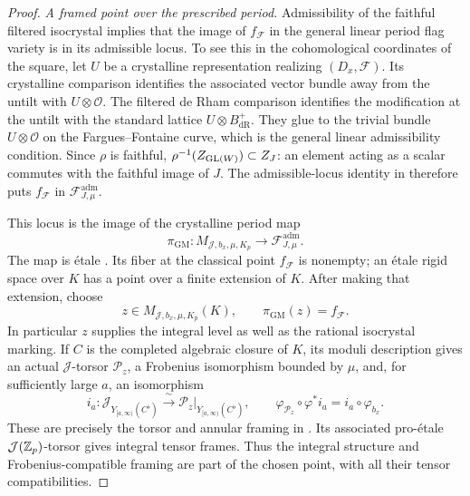 \begin{proof}
\medskip\noindent
\emph{A framed point over the prescribed period.}
Admissibility of the faithful filtered isocrystal implies that
the image of $f_{\mathcal F}$ in the general linear period flag
variety is in its admissible locus.  To see this in the
cohomological coordinates of the square, let $U$ be a crystalline
representation realizing $(D_x,\mathcal F)$.  Its crystalline
comparison identifies the associated vector bundle away from
the untilt with $U\otimes\mathcal O$.  The filtered de Rham
comparison identifies the modification at the untilt with the
standard lattice $U\otimes B_{\mathrm{dR}}^+$.  They glue to the
trivial bundle $U\otimes\mathcal O$ on the Fargues--Fontaine
curve, which is the general linear admissibility condition.
Since $\rho$ is faithful,
$\rho^{-1}(Z_{\operatorname{GL}(W)})\subset Z_J$: an element acting as a scalar
commutes with the faithful image of $J$.  The admissible-locus
identity in \cite[Proposition~3.1.1(i), (3.1.9)]{PappasRapoport2024}
therefore puts $f_{\mathcal F}$ in
$\mathcal F_{J,\mu}^{\mathrm{adm}}$.

This locus is the image of the crystalline period map
\[
 \pi_{\mathrm{GM}}:
 M_{\mathcal J,b_x,\mu,K_p}
       \longrightarrow\mathcal F_{J,\mu}^{\mathrm{adm}}.
\]
The map is \'{e}tale
\cite[\S3.1.1, (3.1.4)]{PappasRapoport2024}.
Its fiber at the classical point $f_{\mathcal F}$ is nonempty;
an \'{e}tale rigid space over $K$ has a point over a finite
extension of $K$.  After making that extension, choose
\begin{equation}
 z\in M_{\mathcal J,b_x,\mu,K_p}(K),
 \qquad \pi_{\mathrm{GM}}(z)=f_{\mathcal F}.
 \label{eq:transport-framed-point}
\end{equation}
In particular $z$ supplies the integral level as well as the
rational isocrystal marking.  If $C$ is the completed algebraic
closure of $K$, its moduli description gives an actual
$\mathcal J$-torsor $\mathcal P_z$, a Frobenius isomorphism
bounded by $\mu$, and, for sufficiently large $a$, an isomorphism
\[
 i_a:\mathcal J_{Y_{[a,\infty)}(C^\flat)}
      \xrightarrow{\ \sim\ }
      \mathcal P_z|_{Y_{[a,\infty)}(C^\flat)},
 \qquad
 \varphi_{\mathcal P_z}\circ\varphi^*i_a
       =i_a\circ\varphi_{b_x}.
\]
These are precisely the torsor and annular framing in
\cite[\S3.1.1]{PappasRapoport2024}.  Its associated
pro-\'{e}tale $\mathcal J(\mathbb Z_p)$-torsor gives integral tensor
frames.  Thus the integral structure and Frobenius-compatible
framing are part of the chosen point, with all their tensor
compatibilities.


\end{proof}
